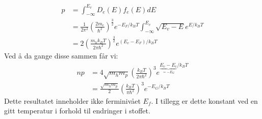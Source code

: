 \documentclass{article}
\begin{document}
\begin{align}
    p &= \int_{-\infty}^{E_v} D_e(E) f_e(E) dE \\&=\frac{1}{2\pi^2} \left(\frac{2m_e}{\hbar^2}\right)^{\frac{3}{2}} e^{-E_F / k_BT}\int_{-\infty}^{E_v} \sqrt{E_v-E} e^{E/k_BT} \\
    &= 2 \left(\frac{m_h k_BT}{2 \pi \hbar^2}\right)^{\frac{3}{2}} e^{(E_v-E_F) / k_BT}
\end{align}
Ved å da gange disse sammen får vi:
\begin{align}
    np &= 4 \sqrt{m_h m_p}\left(\frac{ k_BT}{2 \pi \hbar^2}\right)^{3} e^{\underbrace{E_v-E_c}_{=-E_G} / k_BT}\\
    &= \frac{\sqrt{m_h m_p}}{2} \left(\frac{ k_BT}{\pi \hbar^2}\right)^{3} e^{-E_G / k_BT}
\end{align}
Dette resultatet inneholder ikke ferminivået $E_f$. I tillegg er dette konstant ved en gitt temperatur i forhold til endringer i stoffet.
\end{document}
